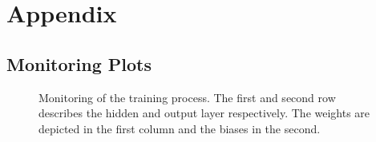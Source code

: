 \appendix
\chapter*{Appendix}
\renewcommand{\thechapter}{A}
\section{Monitoring Plots}
\label{monitoringplots}
\begin{figure}[!htb]
	\centering
    
	\caption[Monitoring of the training process.]{Monitoring of the training process. The first and second row describes the hidden and output layer respectively. The weights are depicted in the first column and the biases in the second.}
	\label{network_monitoring}
\end{figure}